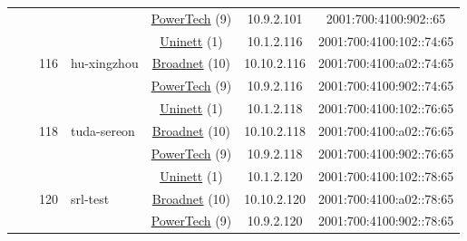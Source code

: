 \begin{small}
\begin{center}
\begin{longtable}{|c|c|c|c|c|c|c|c|}
  &  & \multicolumn{2}{|c|}{} & \multicolumn{2}{|c|}{\tiny{\href{http://www.powertech.no}{PowerTech} (9)}} & \tiny{10.9.2.101} & \tiny{2001:700:4100:902::65} \\* \cline{3-3}\cline{4-4}\cline{5-5}\cline{6-6}\cline{7-7}\cline{8-8}
  &  & \multirow{3}{*}{\tiny{116}} & \multicolumn{1}{|l|}{\multirow{3}{*}{\tiny{hu-xingzhou}}} & \multicolumn{2}{|c|}{\tiny{\href{https://www.uninett.no}{Uninett} (1)}} & \tiny{10.1.2.116} & \tiny{2001:700:4100:102::74:65} \\* \cline{5-5}\cline{6-6}\cline{7-7}\cline{8-8}
  &  &  &  & \multicolumn{2}{|c|}{\tiny{\href{https://www.broadnet.no}{Broadnet} (10)}} & \tiny{10.10.2.116} & \tiny{2001:700:4100:a02::74:65} \\* \cline{5-5}\cline{6-6}\cline{7-7}\cline{8-8}
  &  &  &  & \multicolumn{2}{|c|}{\tiny{\href{http://www.powertech.no}{PowerTech} (9)}} & \tiny{10.9.2.116} & \tiny{2001:700:4100:902::74:65} \\* \cline{3-3}\cline{4-4}\cline{5-5}\cline{6-6}\cline{7-7}\cline{8-8}
  &  & \multirow{3}{*}{\tiny{118}} & \multicolumn{1}{|l|}{\multirow{3}{*}{\tiny{tuda-sereon}}} & \multicolumn{2}{|c|}{\tiny{\href{https://www.uninett.no}{Uninett} (1)}} & \tiny{10.1.2.118} & \tiny{2001:700:4100:102::76:65} \\* \cline{5-5}\cline{6-6}\cline{7-7}\cline{8-8}
  &  &  &  & \multicolumn{2}{|c|}{\tiny{\href{https://www.broadnet.no}{Broadnet} (10)}} & \tiny{10.10.2.118} & \tiny{2001:700:4100:a02::76:65} \\* \cline{5-5}\cline{6-6}\cline{7-7}\cline{8-8}
  &  &  &  & \multicolumn{2}{|c|}{\tiny{\href{http://www.powertech.no}{PowerTech} (9)}} & \tiny{10.9.2.118} & \tiny{2001:700:4100:902::76:65} \\* \cline{3-3}\cline{4-4}\cline{5-5}\cline{6-6}\cline{7-7}\cline{8-8}
  &  & \multirow{3}{*}{\tiny{120}} & \multicolumn{1}{|l|}{\multirow{3}{*}{\tiny{srl-test}}} & \multicolumn{2}{|c|}{\tiny{\href{https://www.uninett.no}{Uninett} (1)}} & \tiny{10.1.2.120} & \tiny{2001:700:4100:102::78:65} \\* \cline{5-5}\cline{6-6}\cline{7-7}\cline{8-8}
  &  &  &  & \multicolumn{2}{|c|}{\tiny{\href{https://www.broadnet.no}{Broadnet} (10)}} & \tiny{10.10.2.120} & \tiny{2001:700:4100:a02::78:65} \\* \cline{5-5}\cline{6-6}\cline{7-7}\cline{8-8}
  &  &  &  & \multicolumn{2}{|c|}{\tiny{\href{http://www.powertech.no}{PowerTech} (9)}} & \tiny{10.9.2.120} & \tiny{2001:700:4100:902::78:65} \\* \cline{3-3}\cline{4-4}\cline{5-5}\cline{6-6}\cline{7-7}\cline{8-8}

\end{longtable}
\end{center}
\end{small}
